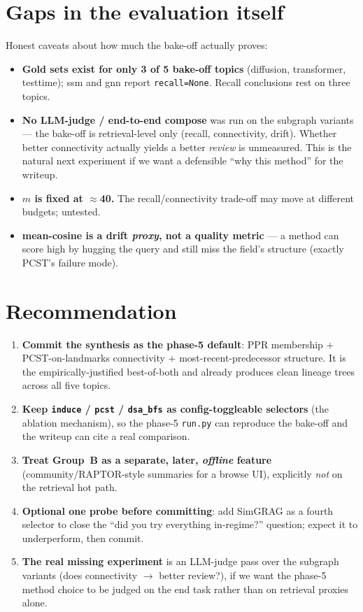 \documentclass[11pt]{article}
\newcommand{\code}[1]{\texttt{\small #1}}
\begin{document}
\section{Gaps in the evaluation itself}

Honest caveats about how much the bake-off actually proves:
\begin{itemize}[leftmargin=1.4em,itemsep=2pt]
  \item \textbf{Gold sets exist for only 3 of 5 bake-off topics} (diffusion, transformer, testtime);
  ssm and gnn report \code{recall=None}. Recall conclusions rest on three topics.
  \item \textbf{No LLM-judge / end-to-end compose} was run on the subgraph variants --- the bake-off
  is retrieval-level only (recall, connectivity, drift). Whether better connectivity actually yields
  a better \emph{review} is unmeasured. This is the natural next experiment if we want a defensible
  ``why this method'' for the writeup.
  \item \textbf{$m$ is fixed at $\approx$40.} The recall/connectivity trade-off may move at different
  budgets; untested.
  \item \textbf{mean-cosine is a drift \emph{proxy}, not a quality metric} --- a method can score high
  by hugging the query and still miss the field's structure (exactly PCST's failure mode).
\end{itemize}

\section{Recommendation}

\begin{enumerate}[leftmargin=1.6em,itemsep=3pt]
  \item \textbf{Commit the synthesis as the phase-5 default}: PPR membership $+$ PCST-on-landmarks
  connectivity $+$ most-recent-predecessor structure. It is the empirically-justified best-of-both
  and already produces clean lineage trees across all five topics.
  \item \textbf{Keep \code{induce} / \code{pcst} / \code{dsa\_bfs} as config-toggleable selectors}
  (the ablation mechanism), so the phase-5 \code{run.py} can reproduce the bake-off and the writeup
  can cite a real comparison.
  \item \textbf{Treat Group~B as a separate, later, \emph{offline} feature} (community/RAPTOR-style
  summaries for a browse UI), explicitly \emph{not} on the retrieval hot path.
  \item \textbf{Optional one probe before committing}: add SimGRAG as a fourth selector to close the
  ``did you try everything in-regime?'' question; expect it to underperform, then commit.
  \item \textbf{The real missing experiment} is an LLM-judge pass over the subgraph variants
  (does connectivity $\to$ better review?), if we want the phase-5 method choice to be judged on the
  end task rather than on retrieval proxies alone.
\end{enumerate}
\end{document}
